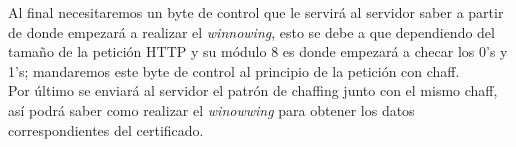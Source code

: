 \documentclass[12pt, a4paper, titlepage]{report}
\begin{document}
		    Al final necesitaremos un byte de control que le servirá al servidor saber a partir de donde empezará a realizar el \textit{winnowing}, esto se debe a que dependiendo del tamaño de la petición HTTP y su módulo 8 es donde empezará a checar los 0's y 1's; mandaremos este byte de control al principio de la petición con chaff.\\
		    
		    Por último se enviará al servidor el patrón de chaffing junto con el mismo chaff, así podrá saber como realizar el \textit{winowwing} para obtener los datos correspondientes del certificado.

\end{document}
